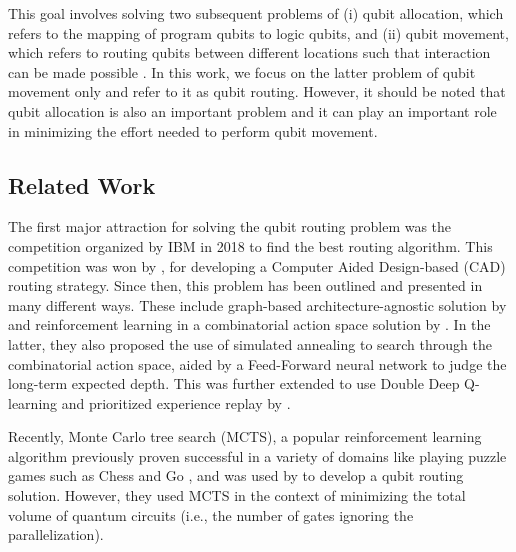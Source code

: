 \documentclass[%
 reprint,
amsmath,amssymb,
pra,
]{revtex4-2}
\begin{document}
This goal involves solving two subsequent problems of (i) qubit allocation, which refers to the mapping of program qubits to logic qubits, and (ii) qubit movement, which refers to routing qubits between different locations such that interaction can be made possible \citep{utk_qubit_noise}. In this work, we focus on the latter problem of qubit movement only and refer to it as qubit routing. However, it should be  noted that qubit allocation is also an important problem and it can play an important role in minimizing the effort needed to perform qubit movement.



\subsection{\label{sec:intro-related}Related Work}

The first major attraction for solving the qubit routing problem was the competition organized by IBM in 2018 to find the best routing algorithm. This competition was won by \citet{zulehner2018mapping}, for developing a Computer Aided Design-based (CAD) routing strategy. Since then, this problem has been outlined and presented in many different ways. These include graph-based architecture-agnostic solution by \citet{qroute_tket} and reinforcement learning in a combinatorial action space solution by \citet{qroute_dqn1}. In the latter, they also proposed the use of simulated annealing to search through the combinatorial action space, aided by a Feed-Forward neural network to judge the long-term expected depth. This was further extended to use Double Deep Q-learning and prioritized experience replay by \citet{qroute_dqn2}. 

Recently, Monte Carlo tree search (MCTS), a popular reinforcement learning algorithm \citep{mcts_survey} previously proven successful in a variety of domains like playing puzzle games such as Chess and Go \citep{mcts_alphago}, and was used by \citet{qroute_mcts} to develop a qubit routing solution. However, they used MCTS in the context of minimizing the total volume of quantum circuits (i.e., the number of gates ignoring the parallelization).

\end{document}
